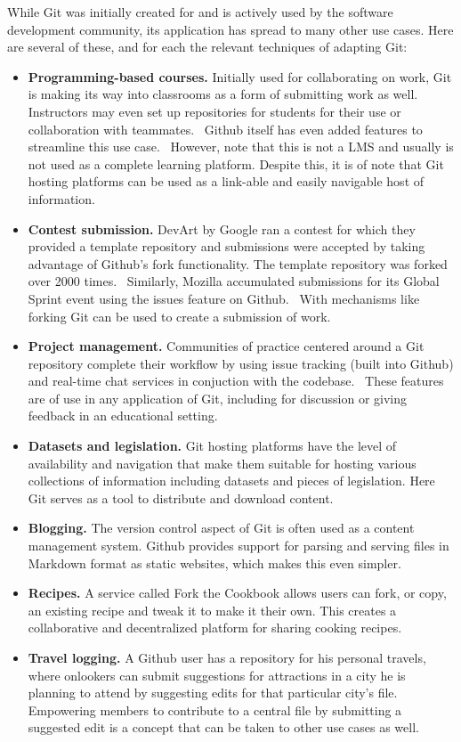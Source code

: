 \documentclass[12pt,twoside]{mitthesis}
\newcommand{\draft}[1]{{\color{blue} #1}}
\begin{document}
\draft{
While Git was initially created for and is actively used by the software development community, its application has spread to many other use cases. Here are several of these, and for each the relevant techniques of adapting Git:
\begin{itemize}
\item \textbf{Programming-based courses.} Initially used for collaborating on work, Git is making its way into classrooms as a form of submitting work as well. Instructors may even set up repositories for students for their use or collaboration with teammates.~\cite{whygithubclassroom} Github itself has even added features to streamline this use case.~\cite{githubclassroom} However, note that this is not a LMS and usually is not used as a complete learning platform. Despite this, it is of note that Git hosting platforms can be used as a link-able and easily navigable host of information.
\item \textbf{Contest submission.} DevArt by Google ran a contest for which they provided a template repository and submissions were accepted by taking advantage of Github's fork functionality. The template repository was forked over 2000 times.~\cite{devart} Similarly, Mozilla accumulated submissions for its Global Sprint event using the issues feature on Github.~\cite{globalsprint} With mechanisms like forking Git can be used to create a submission of work.
\item \textbf{Project management.} Communities of practice centered around a Git repository complete their workflow by using issue tracking (built into Github) and real-time chat services in conjuction with the codebase.~\cite{githubpm} These features are of use in any application of Git, including for discussion or giving feedback in an educational setting.
\item \textbf{Datasets and legislation.} Git hosting platforms have the level of availability and navigation that make them suitable for hosting various collections of information including datasets and pieces of legislation. Here Git serves as a tool to distribute and download content.~\cite{sevenwaysgit}
\item \textbf{Blogging.} The version control aspect of Git is often used as a content management system. Github provides support for parsing and serving files in Markdown format as static websites, which makes this even simpler.~\cite{whygithubclassroom}
\item \textbf{Recipes.} A service called Fork the Cookbook allows users can fork, or copy, an existing recipe and tweak it to make it their own. This creates a collaborative and decentralized platform for sharing cooking recipes.~\cite{forkthecookbook}
\item \textbf{Travel logging.} A Github user has a repository for his personal travels, where onlookers can submit suggestions for attractions in a city he is planning to attend by suggesting edits for that particular city's file.~\cite{travellog} Empowering members to contribute to a central file by submitting a suggested edit is a concept that can be taken to other use cases as well.
\end{itemize}
}
\end{document}
